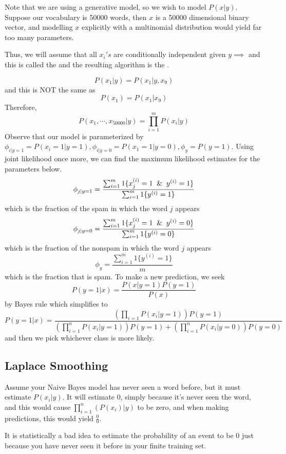 \documentclass[12pt]{scrartcl}
\begin{document}
\begin{note}
    Note that we are using a generative model, so we wish to model $P(x | y)$. Suppose our vocabulary is 50000 words, then $x$ is a 50000 dimensional binary vector, and modelling $x$ explicitly with a multinomial distribution would yield far too many parameters.
\end{note}

Thus, we will assume that all $x_i's$ are conditionally independent given $y
    \implies$ and this is called the  and the
resulting algorithm is the .

\[P(x_1 | y) = P(x_1 | y, x_9)\] and this is NOT the same as
\[P(x_1) = P(x_1 | x_9)\]
Therefore,
\[P(x_1, \cdots, x_{50000} | y) = \prod_{i=1}^m P(x_i | y)\]
Observe that our model is parameterized by $\phi_{i | y = 1} = P(x_i = 1 | y =
    1), \phi_{i | y = 0} = P(x_1 = 1 | y = 0), \phi_y = P(y = 1)$. Using joint
likelihood once more, we can find the maximum likelihood estimates for the
parameters below.
\[\phi_{j | y = 1} = \frac{\sum_{i=1}^m 1\{x_j^{(i)} = 1 \And y^{(i)} = 1\}}{\sum_{i=1}^m 1\{y^{(i)} = 1\}}\]
which is the fraction of the spam in which the word $j$ appears
\[\phi_{j | y = 0} = \frac{\sum_{i=1}^m 1\{x_j^{(i)} = 1 \And y^{(i)} = 0\}}{\sum_{i=1}^m 1\{y^{(i)} = 0\}}\]
which is the fraction of the nonspam in which the word $j$ appears
\[\phi_{y} = \frac{\sum_{i=1}^m 1\{y^{(i)} = 1\}}{m}\]
which is the fraction that is spam. To make a new prediction, we seek \[P(y = 1 | x) = \frac{P(x| y = 1)P(y = 1)}{P(x)}\]
by Bayes rule which simplifies to
\[P(y = 1 | x) = \frac{(\prod_{i=1}P(x_i | y = 1))P(y = 1)}{(\prod_{i=1}^nP(x_i | y = 1))P(y = 1) + (\prod_{i=1}^nP(x_i | y = 0))P(y=0)}\]
and then we pick whichever class is more likely.

\subsection{Laplace Smoothing}

Assume your Naive Bayes model has never seen a word before, but it must
estimate $P(x_i | y)$. It will estimate 0, simply because it's never seen the
word, and this would cause $\prod_{i=1}^n (P(x_i) | y)$ to be zero, and when
making predictions, this would yield $\frac{0}{0}$.

\begin{note}
    It is statistically a bad idea to estimate the probability of an event to be 0 just because you have never seen it before in your finite training set.
\end{note}
\end{document}
